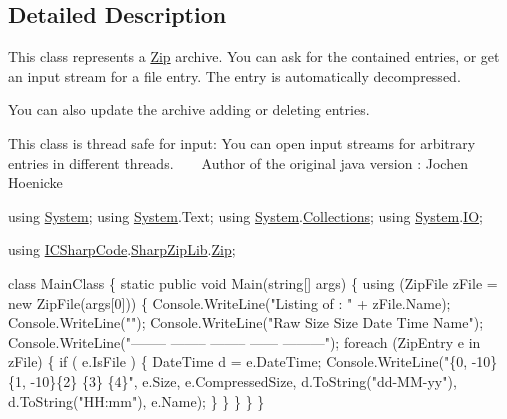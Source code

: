 \subsection{Detailed Description}
This class represents a \hyperlink{namespace_i_c_sharp_code_1_1_sharp_zip_lib_1_1_zip}{Zip} archive. You can ask for the contained entries, or get an input stream for a file entry. The entry is automatically decompressed. 

You can also update the archive adding or deleting entries.

This class is thread safe for input\+: You can open input streams for arbitrary entries in different threads. ~\newline
 ~\newline
Author of the original java version \+: Jochen Hoenicke 


\begin{DoxyCode}
\textcolor{keyword}{using} \hyperlink{namespace_system}{System};
\textcolor{keyword}{using} \hyperlink{namespace_system}{System}.Text;
\textcolor{keyword}{using} \hyperlink{namespace_system}{System}.\hyperlink{namespace_system_1_1_collections}{Collections};
\textcolor{keyword}{using} \hyperlink{namespace_system}{System}.\hyperlink{namespace_system_1_1_i_o}{IO};

\textcolor{keyword}{using} \hyperlink{namespace_i_c_sharp_code}{ICSharpCode}.\hyperlink{namespace_i_c_sharp_code_1_1_sharp_zip_lib}{SharpZipLib}.\hyperlink{namespace_i_c_sharp_code_1_1_sharp_zip_lib_1_1_zip}{Zip};

\textcolor{keyword}{class }MainClass
\{
    \textcolor{keyword}{static} \textcolor{keyword}{public} \textcolor{keywordtype}{void} Main(\textcolor{keywordtype}{string}[] args)
    \{
        \textcolor{keyword}{using} (ZipFile zFile = \textcolor{keyword}{new} ZipFile(args[0])) \{
            Console.WriteLine(\textcolor{stringliteral}{"Listing of : "} + zFile.Name);
            Console.WriteLine(\textcolor{stringliteral}{""});
            Console.WriteLine(\textcolor{stringliteral}{"Raw Size    Size      Date     Time     Name"});
            Console.WriteLine(\textcolor{stringliteral}{"--------  --------  --------  ------  ---------"});
            \textcolor{keywordflow}{foreach} (ZipEntry e \textcolor{keywordflow}{in} zFile) \{
                \textcolor{keywordflow}{if} ( e.IsFile ) \{
                    DateTime d = e.DateTime;
                    Console.WriteLine(\textcolor{stringliteral}{"\{0, -10\}\{1, -10\}\{2\}  \{3\}   \{4\}"}, e.Size, e.CompressedSize,
                        d.ToString(\textcolor{stringliteral}{"dd-MM-yy"}), d.ToString(\textcolor{stringliteral}{"HH:mm"}),
                        e.Name);
                \}
            \}
        \}
    \}
\}
\end{DoxyCode}
 

